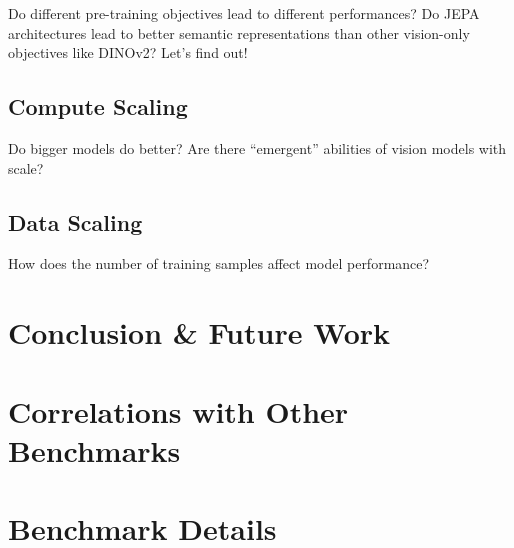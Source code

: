 \documentclass{article}
\begin{document}
Do different pre-training objectives lead to different performances? 
Do JEPA architectures lead to better semantic representations than other vision-only objectives like DINOv2?
Let's find out!

\subsection{Compute Scaling}

Do bigger models do better?
Are there ``emergent'' abilities of vision models with scale?

\subsection{Data Scaling}

How does the number of training samples affect model performance?

\section{Conclusion \& Future Work}

\clearpage



\clearpage

\appendix

\section{Correlations with Other Benchmarks}\label{app:correlations}

\section{Benchmark Details}
\end{document}

